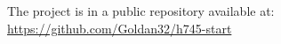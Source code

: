 \appendix
\chapter*{\fuggelek}

The project is in a public repository available at: \newline\url{https://github.com/Goldan32/h745-start}

\setcounter{chapter}{\appendixnumber}

